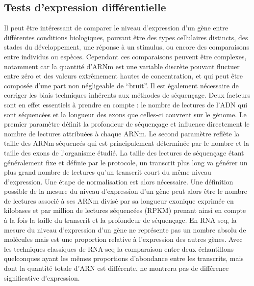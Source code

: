 \subsection{Tests d’expression différentielle}
\label{subsec:expression-différentielle}

Il peut être intéressant de comparer le niveau d’expression d’un gène entre différentes \glspl{condition} biologiques, pouvant être des types cellulaires distincts, des stades du développement, une réponse à un stimulus, ou encore des comparaisons entre individus ou espèces. Cependant ces comparaisons peuvent être complexes, notamment car la quantité d’\acrshort{ARNm} est une variable discrète pouvant fluctuer entre zéro et des valeurs extrêmement hautes de concentration, et qui peut être composée d’une part non négligeable de “bruit”. Il est également nécessaire de corriger les biais techniques inhérents aux méthodes de séquençage. Deux facteurs sont en effet essentiels à prendre en compte : le nombre de lectures de l’\acrshort{ADN} qui sont séquencées et la longueur des exons que celles-ci couvrent sur le génome. Le premier paramètre définit la profondeur de séquençage et influence directement le nombre de lectures attribuées à chaque \acrshort{ARNm}. Le second paramètre reflète la taille des \acrshort{ARNm} séquencés qui est principalement déterminée par le nombre et la taille des exons de l’organisme étudié. La taille des lectures de séquençage étant généralement fixe et définie par le protocole, un transcrit plus long va générer un plus grand nombre de lectures qu’un transcrit court du même niveau d’expression. Une étape de normalisation est alors nécessaire. Une définition possible de la mesure du niveau d’expression d’un gène peut alors être le nombre de lectures associé à ses \acrshort{ARNm} divisé par sa longueur exonique exprimée en kilobases et par million de lectures séquencées (\acrshort{RPKM}) prenant ainsi en compte à la fois la taille du transcrit et la profondeur de séquençage. En \acrshort{RNA-seq}, la mesure du niveau d’expression d’un gène ne représente pas un nombre absolu de molécules mais est une proportion relative à l’expression des autres gènes. Avec les techniques classiques de RNA-seq la comparaison entre deux échantillons quelconques ayant les mêmes proportions d’abondance entre les transcrits, mais dont la quantité totale d’\acrshort{ARN} est différente, ne montrera pas de différence significative d’expression. \\

